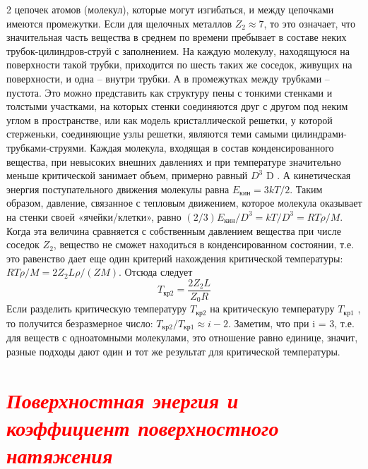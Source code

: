 \begin{multicols}{2}
цепочек атомов (молекул), которые могут
изгибаться, и между цепочками имеются
промежутки. Если для щелочных металлов
$Z_2 \approx 7$, то это означает, что значительная
часть вещества в среднем по времени пребывает в составе неких трубок-цилиндров-струй
с заполнением. На каждую молекулу, находящуюся на поверхности такой трубки, приходится по шесть таких же соседок, живущих на поверхности, и одна – внутри трубки. А в промежутках между трубками –
пустота. Это можно представить как структуру пены с тонкими стенками и толстыми
участками, на которых стенки соединяются
друг с другом под неким углом в пространстве, или как модель кристаллической решетки, у которой стерженьки, соединяющие
узлы решетки, являются теми самыми цилиндрами-трубками-струями.
\indent Каждая молекула, входящая в состав конденсированного вещества, при невысоких
внешних давлениях и при температуре значительно меньше критической занимает
объем, примерно равный $D^3$ D . А кинетическая энергия поступательного движения молекулы равна $E_{кин}=3kT/2$. Таким образом, давление, связанное с тепловым движением, которое молекула оказывает на стенки своей «ячейки/клетки», равно $(2/3)E_{кин}/D^3=kT/D^3=RT\rho/M$. Когда эта
величина сравняется с собственным давлением вещества при числе соседок $Z_2$, вещество не сможет находиться в конденсированном состоянии, т.е. это равенство дает
еще один критерий нахождения критической температуры: $RT\rho/M=2Z_2L\rho/(ZM)$. Отсюда следует $$T_{кр2}=\frac{2Z_2L}{Z_0R}$$ Если разделить критическую температуру $T_{кр2}$ на критическую температуру $T_{кр1}$ , то получится безразмерное число: $T_{кр2}/T_{кр1}\approx i-2$. Заметим, что при i = 3, т.е. для веществ с одноатомными молекулами, это отношение равно единице, значит, разные подходы дают один и тот же результат для критической температуры.
\section*{\centering\large\textit{\textcolor{red}{Поверхностная энергия и
коэффициент поверхностного натяжения}}}



\end{multicols}
